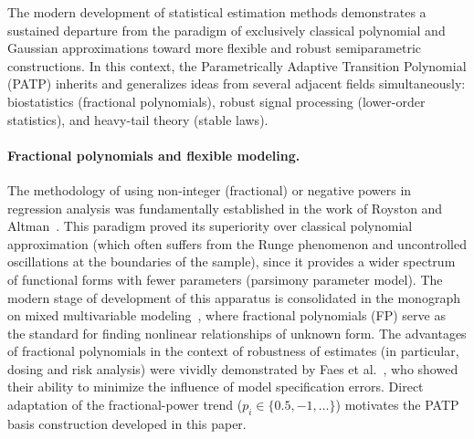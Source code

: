 \documentclass[11pt]{article}
\theoremstyle{definition}
\begin{document}
The modern development of statistical estimation methods demonstrates a
sustained departure from the paradigm of exclusively classical polynomial and
Gaussian approximations toward more flexible and robust semiparametric
constructions. In this context, the Parametrically Adaptive Transition
Polynomial (PATP) inherits and generalizes ideas from several adjacent
fields simultaneously: biostatistics (fractional polynomials), robust signal
processing (lower-order statistics), and heavy-tail theory (stable laws).

\paragraph{Fractional polynomials and flexible modeling.}
The methodology of using non-integer (fractional) or negative powers in
regression analysis was fundamentally established in the work of Royston and
Altman~\citep{royston1994}. This paradigm proved its superiority over
classical polynomial approximation (which often suffers from the Runge
phenomenon and uncontrolled oscillations at the boundaries of the sample),
since it provides a wider spectrum of functional forms with fewer parameters
(parsimony parameter model). The modern stage of development of this
apparatus is consolidated in the monograph on mixed multivariable
modeling~\citep{royston2008multivariable, sauerbrei1999building}, where
fractional polynomials (FP) serve as the standard for finding nonlinear
relationships of unknown form. The advantages of fractional polynomials in
the context of robustness of estimates (in particular, dosing and risk
analysis) were vividly demonstrated by Faes et al.~\citep{faes2003fractional},
who showed their ability to minimize the influence of model specification
errors. Direct adaptation of the fractional-power trend
($p_i \in \{0.5, -1, \dots\}$) motivates the PATP basis construction
developed in this paper.
\end{document}
